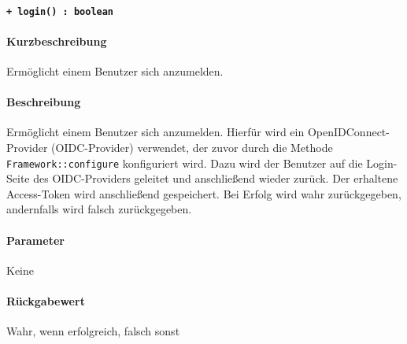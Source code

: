 \paragraph{\texttt{+ login() : boolean}}%
\paragraph*{Kurzbeschreibung}
Ermöglicht einem Benutzer sich anzumelden.
\paragraph*{Beschreibung}
Ermöglicht einem Benutzer sich anzumelden.
Hierfür wird ein OpenIDConnect-Provider (OIDC-Provider) verwendet, der zuvor durch die Methode \verb#Framework::configure# konfiguriert wird.
Dazu wird der Benutzer auf die Login-Seite des OIDC-Providers geleitet und anschließend wieder zurück.
Der erhaltene Access-Token wird anschließend gespeichert.
Bei Erfolg wird wahr zurückgegeben, andernfalls wird falsch zurückgegeben.
\paragraph*{Parameter}
Keine
\paragraph*{Rückgabewert}
Wahr, wenn erfolgreich, falsch sonst
